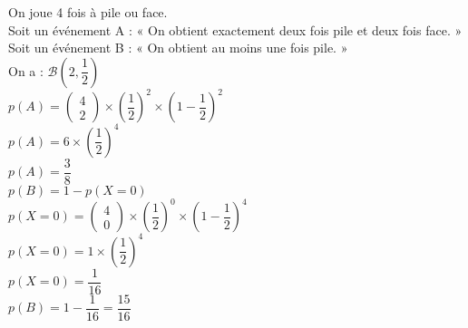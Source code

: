On joue 4 fois à pile ou face. \\

Soit un événement A : « On obtient exactement deux fois pile et deux fois face. » \\

Soit un événement B : « On obtient au moins une fois pile. » \\

On a : $\mathcal{B} \left(2,\dfrac{1}{2}\right) $ \\

$p\left(A\right) = \left( \begin{array}{c} 4 \\ 2 \end{array} \right) \times \left(\dfrac{1}{2}\right)^2 \times \left( 1 - \dfrac{1}{2} \right)^2 $ \\

$ p\left(A\right) = 6 \times \left(\dfrac{1}{2} \right)^4 $ \\

$ p\left(A\right) = \dfrac{3}{8} $ \\

$ p\left(B\right) = 1 - p\left(X=0\right) $ \\

$p\left(X=0\right) = \left( \begin{array}{c} 4 \\ 0 \end{array} \right) \times \left(\dfrac{1}{2}\right)^0 \times \left(1 - \dfrac{1}{2} \right)^4 $ \\

$p\left(X=0\right) = 1 \times \left(\dfrac{1}{2}\right)^4 $ \\

$ p\left(X=0\right) = \dfrac{1}{16} $ \\

$ p\left(B\right) = 1 - \dfrac{1}{16} = \dfrac{15}{16} $ \\
 

\ifdefined\COMPLETE
\else
    
\fi